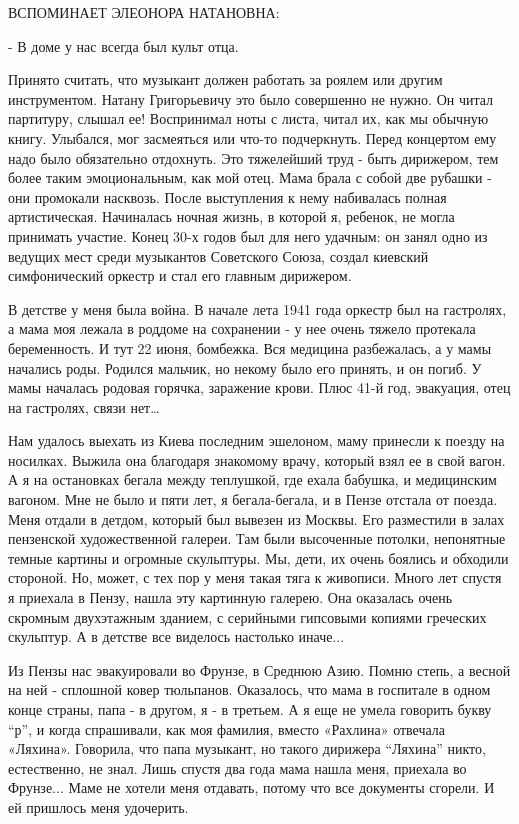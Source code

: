 ВСПОМИНАЕТ ЭЛЕОНОРА НАТАНОВНА:

- В доме у нас всегда был культ отца.

Принято считать, что музыкант должен работать за роялем или другим
инструментом. Натану Григорьевичу это было совершенно не нужно. Он читал
партитуру, слышал ее! Воспринимал ноты с листа, читал их, как мы обычную книгу.
Улыбался, мог засмеяться или что-то подчеркнуть. Перед концертом ему надо было
обязательно отдохнуть. Это тяжелейший труд - быть дирижером, тем более таким
эмоциональным, как мой отец. Мама брала с собой две рубашки - они промокали
насквозь. После выступления к нему набивалась полная артистическая. Начиналась
ночная жизнь, в которой я, ребенок, не могла принимать участие. Конец 30-х
годов был для него удачным: он занял одно из ведущих мест среди музыкантов
Советского Союза, создал киевский симфонический оркестр и стал его главным
дирижером. 

В детстве у меня была война. В начале лета 1941 года оркестр был на гастролях,
а мама моя лежала в роддоме на сохранении - у нее очень тяжело протекала
беременность. И тут 22 июня, бомбежка. Вся медицина разбежалась, а у мамы
начались роды. Родился мальчик, но некому было его принять, и он погиб. У мамы
началась родовая горячка, заражение крови. Плюс 41-й год, эвакуация, отец на
гастролях, связи нет… 

Нам удалось выехать из Киева последним эшелоном, маму принесли к поезду на
носилках. Выжила она благодаря знакомому врачу, который взял ее в свой вагон. А
я на остановках бегала между теплушкой, где ехала бабушка, и медицинским
вагоном. Мне не было и пяти лет, я бегала-бегала, и в Пензе отстала от поезда.
Меня отдали в детдом, который был вывезен из Москвы. Его разместили в залах
пензенской художественной галереи. Там были высоченные потолки, непонятные
темные картины и огромные скульптуры. Мы, дети, их очень боялись и обходили
стороной. Но, может, с тех пор у меня такая тяга к живописи. Много лет спустя я
приехала в Пензу, нашла эту картинную галерею. Она оказалась очень скромным
двухэтажным зданием, с серийными гипсовыми копиями греческих скульптур. А в
детстве все виделось настолько иначе... 

Из Пензы нас эвакуировали во Фрунзе, в Среднюю Азию. Помню степь, а весной на
ней - сплошной ковер тюльпанов. Оказалось, что мама в госпитале в одном конце
страны, папа - в другом, я - в третьем. А я еще не умела говорить букву “р”, и
когда спрашивали, как моя фамилия, вместо «Рахлина» отвечала «Ляхина».
Говорила, что папа музыкант, но такого дирижера “Ляхина” никто, естественно, не
знал. Лишь спустя два года мама нашла меня, приехала во Фрунзе... Маме не
хотели меня отдавать, потому что все документы сгорели. И ей пришлось меня
удочерить. 

